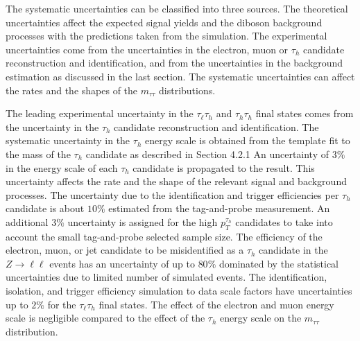 The systematic uncertainties can be classified into three sources. The theoretical uncertainties affect the expected signal yields and the diboson background processes with the predictions taken from the simulation. The experimental uncertainties come from the uncertainties in the electron, muon or $\tau_h$ candidate reconstruction and identification, and from the uncertainties in the background estimation as discussed in the last section. The systematic uncertainties can affect the rates and the shapes of the $m_{\tau\tau}$ distributions. 

The leading experimental uncertainty in the $\tau_{\ell}\tau_h$ and $\tau_h\tau_h$ final states comes from the uncertainty in the $\tau_h$ candidate reconstruction and identification. The systematic uncertainty in the $\tau_h$ energy scale is obtained from the template fit to the mass of the $\tau_h$ candidate as described in Section 4.2.1 An uncertainty of $3\%$ in the energy scale of each $\tau_h$ candidate is propagated to the result. This uncertainty affects the rate and the shape of the relevant signal and background processes. The uncertainty due to the identification and trigger efficiencies per $\tau_h$ candidate is about $10\%$ estimated from the tag-and-probe measurement. An additional $3\%$ uncertainty is assigned for the high $p_{T}^{\tau_h}$ candidates to take into account the small tag-and-probe selected sample size. The efficiency of the electron, muon, or jet candidate to be misidentified as a $\tau_h$ candidate in the $Z\rightarrow\ell\ell$ events has an uncertainty of up to $80\%$ dominated by the statistical uncertainties due to limited number of simulated events. The identification, isolation, and trigger efficiency simulation to data scale factors have uncertainties up to $2\%$ for the $\tau_{\ell}\tau_h$ final states. The effect of the electron and muon energy scale is negligible compared to the effect of the $\tau_h$ energy scale on the $m_{\tau\tau}$ distribution. 
